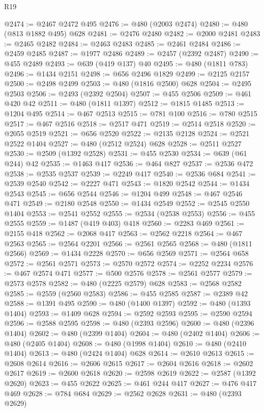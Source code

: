 \begin{lexlean}{R19}
\begin{coremodule}
@2474 := @2467 @2472 @495
@2476 := @480 (@2003 @2474)
@2480 := @480 (@813 @1882 @495) @628
@2481 := @2476 @2480
@2482 := @2000 @2481
@2483 := @2465 @2482
@2484 := @2463 @2483
@2485 := @2461 @2484
@2486 := @2459 @2485
@2487 := @1977 @2486
@2489 := @2457 (@2392 @2487)
@2490 := @455 @2489
@2493 := @639 (@419 @137) @40
@2495 := @480 (@1811 @783)
@2496 := @1434 @2151
@2498 := @656 @2496 @1829
@2499 := @2125 @2157
@2500 := @2498 @2499
@2503 := @480 (@1816 @2500) @628
@2504 := @2495 @2503
@2506 := @2493 (@2392 @2504)
@2507 := @455 @2506
@2509 := @461 @420 @42
@2511 := @480 (@1811 @1397)
@2512 := @1815 @1485
@2513 := @1204 @495
@2514 := @467 @2513
@2515 := @781 @100
@2516 := @780 @2515
@2517 := @467 @2516
@2518 := @2517 @471
@2519 := @2514 @2518
@2520 := @2055 @2519
@2521 := @656 @2520
@2522 := @2135 @2128
@2524 := @2521 @2522 @1404
@2527 := @480 (@2512 @2524) @628
@2528 := @2511 @2527
@2530 := @2509 (@1392 @2528)
@2531 := @455 @2530
@2534 := @639 (@61 @244) @42
@2535 := @1463 @417
@2536 := @464 @827
@2537 := @2536 @472
@2538 := @2535 @2537
@2539 := @2249 @417
@2540 := @2536 @684
@2541 := @2539 @2540
@2542 := @2227 @471
@2543 := @1820 @2542
@2544 := @1434 @2543
@2545 := @656 @2544
@2546 := @1204 @499
@2548 := @467 @2546 @471
@2549 := @2180 @2548
@2550 := @1434 @2549
@2552 := @2545 @2550 @1404
@2553 := @2541 @2552
@2555 := @2534 (@2538 @2553)
@2556 := @455 @2555
@2559 := @1487 (@419 @403) @418
@2560 := @2283 @469
@2561 := @2155 @418
@2562 := @2068 @417
@2563 := @2562 @2218
@2564 := @467 @2563
@2565 := @2564 @2201
@2566 := @2561 @2565
@2568 := @480 (@1811 @2566)
@2569 := @1434 @2228
@2570 := @656 @2569
@2571 := @2564 @658
@2572 := @2561 @2571
@2573 := @2570 @2572
@2574 := @2252 @2234
@2576 := @467 @2574 @471
@2577 := @500 @2576
@2578 := @2561 @2577
@2579 := @2573 @2578
@2582 := @480 (@2225 @2579) @628
@2583 := @2568 @2582
@2585 := @2559 (@2560 @2583)
@2586 := @455 @2585
@2587 := @2389 @42
@2588 := @1391 @495
@2590 := @480 (@1400 @1397)
@2592 := @480 (@1393 @1404)
@2593 := @1409 @628
@2594 := @2592 @2593
@2595 := @2590 @2594
@2596 := @2588 @2595
@2598 := @480 (@2393 @2596)
@2600 := @480 (@2396 @1404)
@2602 := @480 (@2399 @1404)
@2604 := @480 (@2402 @1404)
@2606 := @480 (@2405 @1404)
@2608 := @480 (@1998 @1404)
@2610 := @480 (@2410 @1404)
@2613 := @480 (@2424 @1404) @628
@2614 := @2610 @2613
@2615 := @2608 @2614
@2616 := @2606 @2615
@2617 := @2604 @2616
@2618 := @2602 @2617
@2619 := @2600 @2618
@2620 := @2598 @2619
@2622 := @2587 (@1392 @2620)
@2623 := @455 @2622
@2625 := @461 @244 @417
@2627 := @476 @417 @469
@2628 := @784 @684
@2629 := @2562 @2628
@2631 := @480 (@2393 @2629)

\end{coremodule}
\end{lexlean}
